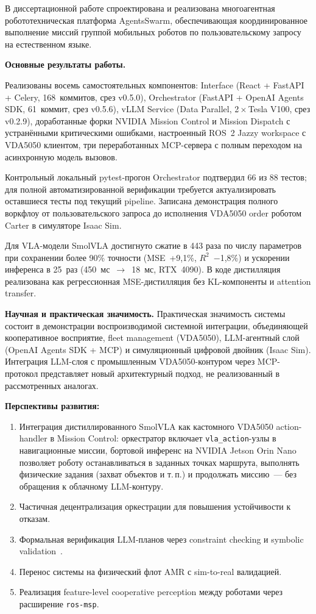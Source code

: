 \documentclass[14pt,a4paper]{extreport}
\begin{document}
В диссертационной работе спроектирована и реализована многоагентная робототехническая платформа AgentsSwarm, обеспечивающая координированное выполнение миссий группой мобильных роботов по пользовательскому запросу на естественном языке.

\textbf{Основные результаты работы.}

Реализованы восемь самостоятельных компонентов: Interface (React + FastAPI + Celery, 168~коммитов, срез v0.5.0), Orchestrator (FastAPI + OpenAI Agents SDK, 61~коммит, срез v0.5.6), vLLM Service (Data Parallel, 2\,$\times$\,Tesla V100, срез v0.2.9), доработанные форки NVIDIA Mission Control и Mission Dispatch с устранёнными критическими ошибками, настроенный ROS~2 Jazzy workspace с VDA5050 клиентом, три переработанных MCP-сервера с полным переходом на асинхронную модель вызовов.

Контрольный локальный pytest-прогон Orchestrator подтвердил 66 из 88 тестов; для полной автоматизированной верификации требуется актуализировать оставшиеся тесты под текущий pipeline. Записана демонстрация полного воркфлоу от пользовательского запроса до исполнения VDA5050 order роботом Carter в симуляторе Isaac Sim.

Для VLA-модели SmolVLA достигнуто сжатие в 443 раза по числу параметров при сохранении более 90\% точности (MSE~+9{,}1\%, $R^2$~$-$1{,}8\%) и ускорении инференса в 25~раз (450~мс~$\to$~18~мс, RTX~4090). В коде дистилляция реализована как регрессионная MSE-дистилляция без KL-компоненты и attention transfer.

\textbf{Научная и практическая значимость.} Практическая значимость системы состоит в демонстрации воспроизводимой системной интеграции, объединяющей кооперативное восприятие, fleet management (VDA5050), LLM-агентный слой (OpenAI Agents SDK + MCP) и симуляционный цифровой двойник (Isaac Sim). Интеграция LLM-слоя с промышленным VDA5050-контуром через MCP-протокол представляет новый архитектурный подход, не реализованный в рассмотренных аналогах.

\textbf{Перспективы развития:}
\begin{enumerate}
  \item Интеграция дистиллированного SmolVLA как кастомного VDA5050 action-handler в Mission Control: оркестратор включает \texttt{vla\_action}-узлы в навигационные миссии, бортовой инференс на NVIDIA Jetson Orin Nano позволяет роботу останавливаться в заданных точках маршрута, выполнять физические задания (захват объектов и т.\,п.) и продолжать миссию~--- без обращения к облачному LLM-контуру.
  \item Частичная децентрализация оркестрации для повышения устойчивости к отказам.
  \item Формальная верификация LLM-планов через constraint checking и symbolic validation~\cite{pan2025selp}.
  \item Перенос системы на физический флот AMR с sim-to-real валидацией.
  \item Реализация feature-level cooperative perception между роботами через расширение \texttt{ros-msp}.
\end{enumerate}
\end{document}
